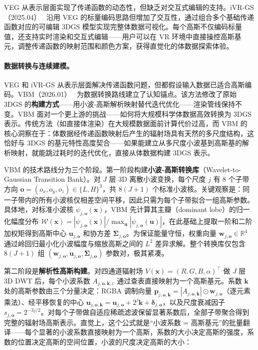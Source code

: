 VEG 从表示层面实现了传递函数的动态性，但缺乏对交互式编辑的支持。iVR-GS（2025.04）~\cite{2504_17954} 沿用 VEG 的标量编码思路但增加了交互性，通过组合多个基础传递函数对应的可编辑 3DGS 模型实现完整体数据可视化。每个高斯不仅编码标量值，还支持实时渲染和交互式编辑——用户可以在 VR 环境中直接操控高斯基元，调整传递函数的映射范围和颜色方案，获得直觉化的体数据探索体验。

\paragraph{数据转换与连续建模。}

VEG 和 iVR-GS 从表示层面解决传递函数问题，但都假设输入数据已适合高斯编码。VBM（2026.01）~\cite{2601_09417} 为数据转换路线建立了认知锚点。该方法修改了原始 3DGS 的\textbf{构建方式}——用小波-高斯解析映射替代迭代优化——渲染管线保持不变。VBM 面对一个更上游的挑战——如何将大规模科学体数据高效转换为 3DGS 表示。传统方法（如直接体渲染）在大规模数据面前计算代价过高，而 VBM 的核心洞察在于：体数据经传递函数映射后产生的辐射场具有天然的多尺度结构，这恰好与 3DGS 的基元特性高度契合——如果能建立从多尺度小波基到高斯基的解析映射，就能跳过耗时的迭代优化，直接从体数据构建 3DGS 表示。

VBM 的技术路线分为三个阶段。第一阶段构建\textbf{小波-高斯转换库}（Wavelet-to-Gaussian Transition Bank）。对 $J$ 层 3D 离散小波变换，每个尺度 $j$ 有 8 个子带方向 $\mathbf{o} = (o_x, o_y, o_z) \in \{L, H\}^3$，共 $8(J{+}1)$ 个标准小波核。关键观察是：同一子带内的所有小波核仅相差空间平移，因此只需为每个子带拟合一组高斯参数。具体地，对标准小波核 $\psi_{j,\mathbf{o}}(\mathbf{x})$，VBM 先计算其主瓣（dominant lobe）的归一化幅度分布 $\mathcal{W}(\mathbf{x}) = |\psi_{j,\mathbf{o}}(\mathbf{x})| / \max_{\mathbf{u}} |\psi_{j,\mathbf{o}}(\mathbf{u})|$，在此基础上提取一阶和二阶加权矩得到高斯中心 $\mathbf{u}_{j,\mathbf{o}}$ 和协方差 $\boldsymbol{\Sigma}_{j,\mathbf{o}}$。为保证能量守恒，权重向量 $\mathbf{w}_{j,\mathbf{o}} \in \mathbb{R}^4$ 通过岭回归最小化小波幅度与缩放高斯之间的 $L^2$ 差异求解。整个转换库仅包含 $8(J{+}1)$ 组 $(\mathbf{w}_{j,\mathbf{o}}, \mathbf{u}_{j,\mathbf{o}}, \boldsymbol{\Sigma}_{j,\mathbf{o}})$ 参数对，极其紧凑。

第二阶段是\textbf{解析性高斯构建}。对四通道辐射场 $V(\mathbf{x}) = (R, G, B, \alpha)^\top$ 做 $J$ 层 3D DWT 后，每个小波系数 $A_{j,\mathbf{o},\mathbf{k},c}$ 通过查表直接映射为一个高斯基元。系数 $\mathbf{k}$ 处的高斯参数由三个分量决定：RGBA 调制向量 $\mathbf{p}_{j,\mathbf{o},\mathbf{k}} = |A_{j,\mathbf{o},\mathbf{k}}| \odot \mathbf{w}_{j,\mathbf{o}}$（逐元素乘法）、经平移恢复的中心 $\mathbf{u}_{j,\mathbf{o},\mathbf{k}} = \mathbf{u}_{j,\mathbf{o}} + 2^j \mathbf{k} + \boldsymbol{\delta}_{j,\mathbf{o}}$，以及尺度衰减因子 $s_{j,\mathbf{o}} = 2^{-3j/2}$。对每个子带做自适应稀疏滤波保留显著系数后，全部子带聚合得到完整的辐射场高斯表示。直觉上，这个公式就是“小波系数 = 高斯基元”的批量翻译——每个显著的小波系数直接映射为一个高斯，系数的大小决定高斯的强度，系数的位置决定高斯的空间位置，小波的尺度决定高斯的大小：


